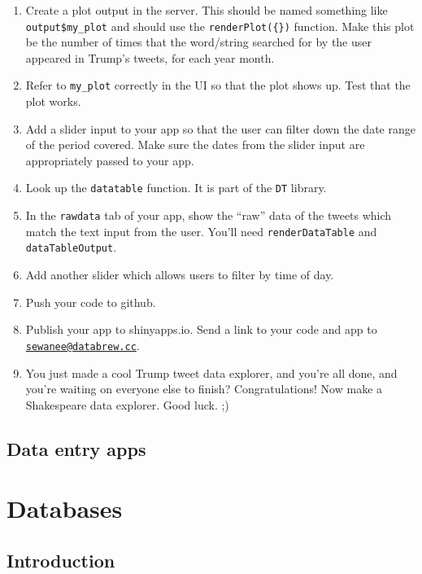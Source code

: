 \documentclass[
]{book}
\begin{document}
\begin{enumerate}
\def\labelenumi{\arabic{enumi}.}
\setcounter{enumi}{9}
\item
  Create a plot output in the server. This should be named something like \texttt{output\$my\_plot} and should use the \texttt{renderPlot(\{\})} function. Make this plot be the number of times that the word/string searched for by the user appeared in Trump's tweets, for each year month.
\item
  Refer to \texttt{my\_plot} correctly in the UI so that the plot shows up. Test that the plot works.
\item
  Add a slider input to your app so that the user can filter down the date range of the period covered. Make sure the dates from the slider input are appropriately passed to your app.
\item
  Look up the \texttt{datatable} function. It is part of the \texttt{DT} library.
\item
  In the \texttt{rawdata} tab of your app, show the ``raw'' data of the tweets which match the text input from the user. You'll need \texttt{renderDataTable} and \texttt{dataTableOutput}.
\item
  Add another slider which allows users to filter by time of day.
\item
  Push your code to github.
\item
  Publish your app to shinyapps.io. Send a link to your code and app to \href{mailto:sewanee@databrew.cc}{\nolinkurl{sewanee@databrew.cc}}.
\item
  You just made a cool Trump tweet data explorer, and you're all done, and you're waiting on everyone else to finish? Congratulations! Now make a Shakespeare data explorer. Good luck. ;)
\end{enumerate}

\hypertarget{data-entry-apps}{%
\chapter{Data entry apps}\label{data-entry-apps}}

\hypertarget{part-databases}{%
\part{Databases}\label{part-databases}}

\hypertarget{introduction-1}{%
\chapter{Introduction}\label{introduction-1}}
\end{document}
